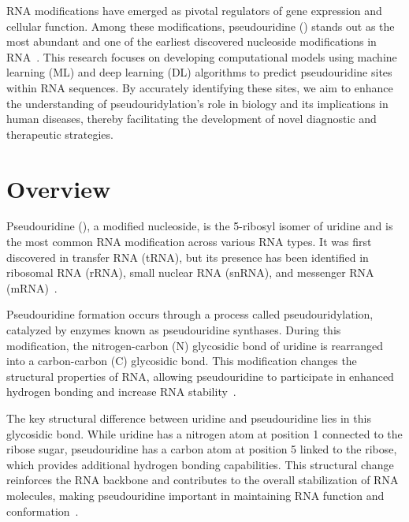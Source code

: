 RNA modifications have emerged as pivotal regulators of gene expression and cellular function.
Among these modifications, pseudouridine (\pseudo) stands out as the most abundant and one of the earliest discovered nucleoside modifications in RNA~\cite{charette_pseudouridine_2000}.
This research focuses on developing computational models using machine learning (ML) and deep learning (DL) algorithms to predict pseudouridine sites within RNA sequences.
By accurately identifying these sites, we aim to enhance the understanding of pseudouridylation's role in biology and its implications in human diseases, thereby facilitating the development of novel diagnostic and therapeutic strategies.


\section{Overview}\label{sec:overview}
  Pseudouridine (\pseudo), a modified nucleoside, is the 5-ribosyl isomer of uridine and is the most common RNA modification across various RNA types.
  It was first discovered in transfer RNA (tRNA), but its presence has been identified in ribosomal RNA (rRNA), small nuclear RNA (snRNA), and messenger RNA (mRNA)~\cite{cohn_nucleoside-5-phosphates_1951}.

  Pseudouridine formation occurs through a process called pseudouridylation, catalyzed by enzymes known as pseudouridine synthases.
  During this modification, the nitrogen-carbon (N) glycosidic bond of uridine is rearranged into a carbon-carbon (C) glycosidic bond.
  This modification changes the structural properties of RNA, allowing pseudouridine to participate in enhanced hydrogen bonding and increase RNA stability~\cite{charette_pseudouridine_2000}.

  The key structural difference between uridine and pseudouridine lies in this glycosidic bond.
  While uridine has a nitrogen atom at position 1 connected to the ribose sugar, pseudouridine has a carbon atom at position 5 linked to the ribose, which provides additional hydrogen bonding capabilities.
  This structural change reinforces the RNA backbone and contributes to the overall stabilization of RNA molecules, making pseudouridine important in maintaining RNA function and conformation~\cite{ge_rna_2013}.

